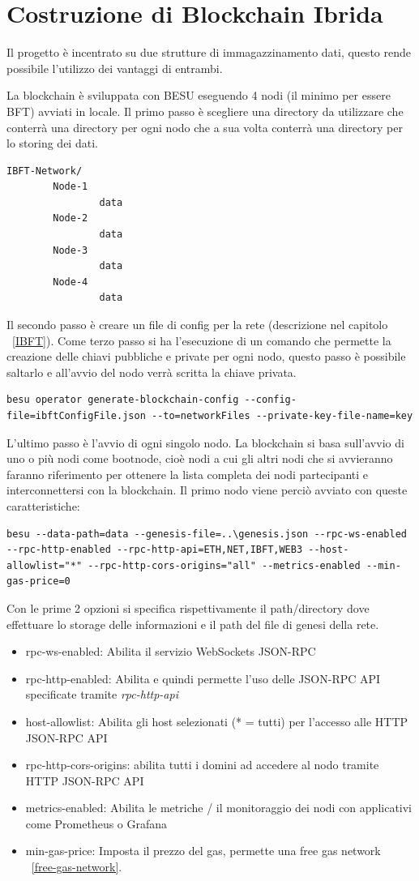 \documentclass[11pt,a4paper,titlepage, twoside, openright]{report}
\begin{document}
\section{Costruzione di Blockchain Ibrida}
Il progetto è incentrato su due strutture di immagazzinamento dati, questo rende possibile l'utilizzo dei vantaggi di entrambi.

La blockchain è sviluppata con BESU eseguendo 4 nodi (il minimo per essere BFT) avviati in locale.
Il primo passo è scegliere una directory da utilizzare che conterrà una directory per ogni nodo che a sua volta conterrà una directory per lo storing dei dati.
\begin{lstlisting}[language=command.com]
IBFT-Network/
		Node-1
				data
		Node-2
				data
		Node-3
				data
		Node-4
				data
\end{lstlisting}

Il secondo passo è creare un file di config per la rete (descrizione nel capitolo ~\ref{IBFT}).
Come terzo passo si ha l'esecuzione di un comando che permette la creazione delle chiavi pubbliche e private per ogni nodo, questo passo è possibile saltarlo e all'avvio del nodo verrà scritta la chiave privata.
\begin{lstlisting}[language=command.com]
besu operator generate-blockchain-config --config-file=ibftConfigFile.json --to=networkFiles --private-key-file-name=key
\end{lstlisting}

L'ultimo passo è l'avvio di ogni singolo nodo. La blockchain si basa sull'avvio di uno o più nodi come bootnode, cioè nodi a cui gli altri nodi che si avvieranno faranno riferimento per ottenere la lista completa dei nodi partecipanti e interconnettersi con la blockchain.
Il primo nodo viene perciò avviato con queste caratteristiche:
\begin{lstlisting}[language=command.com]
besu --data-path=data --genesis-file=..\genesis.json --rpc-ws-enabled --rpc-http-enabled --rpc-http-api=ETH,NET,IBFT,WEB3 --host-allowlist="*" --rpc-http-cors-origins="all" --metrics-enabled --min-gas-price=0
\end{lstlisting}

Con le prime 2 opzioni si specifica rispettivamente il path/directory dove effettuare lo storage delle informazioni e il path del file di genesi della rete. 
\begin{itemize}
\item rpc-ws-enabled: Abilita il servizio WebSockets JSON-RPC
\item rpc-http-enabled: Abilita e quindi permette l'uso delle JSON-RPC API specificate tramite \textit{rpc-http-api}
\item host-allowlist: Abilita gli host selezionati (* = tutti) per l'accesso alle HTTP JSON-RPC API
\item rpc-http-cors-origins: abilita tutti i domini ad accedere al nodo tramite HTTP JSON-RPC API
\item metrics-enabled: Abilita le metriche / il monitoraggio dei nodi con applicativi come Prometheus o Grafana
\item min-gas-price: Imposta il prezzo del gas, permette una free gas network ~\ref{free-gas-network}.
\end{itemize}
\end{document}
